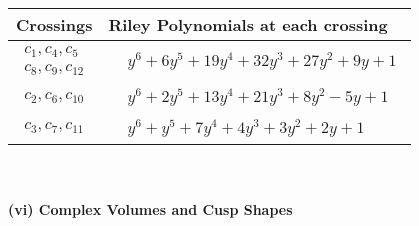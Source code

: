 \documentclass[1p]{elsarticle_modified}
\theoremstyle{definition}
\begin{document}
\begin{tabular}{m{50pt}|m{274pt}}
Crossings & \hspace{64pt}Riley Polynomials at each crossing \\
\hline $$\begin{aligned}c_{1},c_{4},c_{5}\\c_{8},c_{9},c_{12}\end{aligned}$$&$\begin{aligned}
&y^6+6 y^5+19 y^4+32 y^3+27 y^2+9 y+1
\end{aligned}$\\
\hline $$\begin{aligned}c_{2},c_{6},c_{10}\end{aligned}$$&$\begin{aligned}
&y^6+2 y^5+13 y^4+21 y^3+8 y^2-5 y+1
\end{aligned}$\\
\hline $$\begin{aligned}c_{3},c_{7},c_{11}\end{aligned}$$&$\begin{aligned}
&y^6+y^5+7 y^4+4 y^3+3 y^2+2 y+1
\end{aligned}$\\
\hline
\end{tabular}\\~\\
\newpage\flushleft \textbf{(vi) Complex Volumes and Cusp Shapes}
\end{document}
